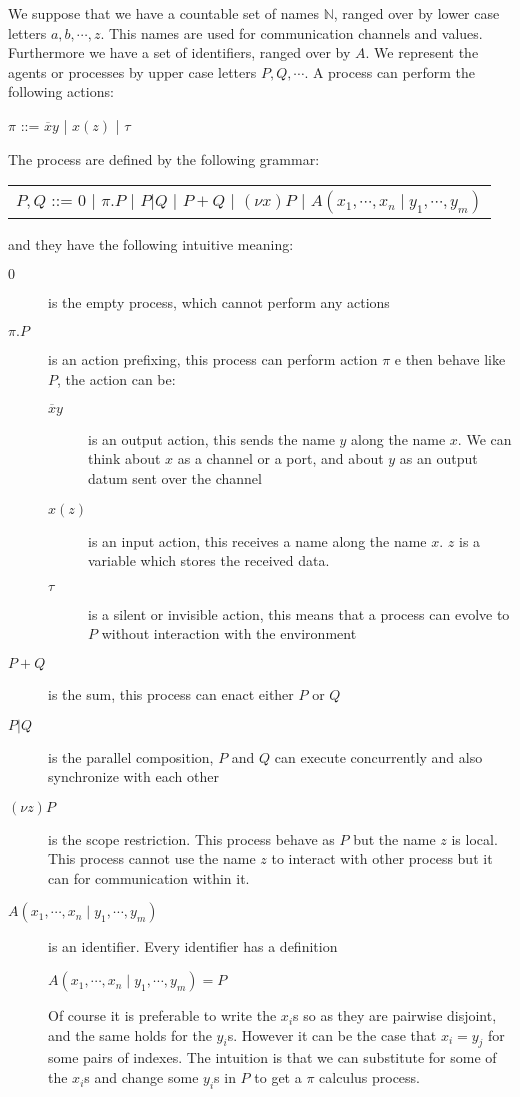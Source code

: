 We suppose that we have a countable set of names $\mathbb{N}$, ranged over by lower case letters $a,b, \cdots, z$. This names are used for communication channels and values. Furthermore we have a set of identifiers, ranged over by $A$. We represent the agents or processes by upper case letters $P,Q, \cdots $. A process can perform the following actions:
\begin{center}
  $\pi$ ::= $\overline{x}y$ | $x(z)$ | $\tau$ 
\end{center}
The process are defined by the following grammar:
\begin{center}
  \begin{tabular}{l}
    $P,Q$ ::= $0$ | $\pi.P$ | $P|Q$ | $P+Q$ | $(\nu x) P$ | $A(x_{1}, \cdots, x_{n}\; | \;y_{1}, \cdots, y_{m})$ 
  \end{tabular}
\end{center}
and they have the following intuitive meaning:
\begin{description}
  \item[$0$] 
    is the empty process, which cannot perform any actions
  \item[$\pi.P$] 
    is an action prefixing, this process can perform action $\pi$ e then behave like $P$, the action can be:
    \begin{description}
      \item[$\overline{x}y$] 
	is an output action, this sends the name $y$ along the name $x$. We can think about $x$ as a channel or a port, and about $y$ as an output datum sent over the channel
      \item[$x(z)$] 
	is an input action, this receives a name along the name $x$. $z$ is a variable which stores the received data.
      \item[$\tau$] 
	is a silent or invisible action, this means that a process can evolve to $P$ without interaction with the environment 
    \end{description}
  \item[$P+Q$] 
    is the sum, this process can enact either $P$ or $Q$
  \item[$P|Q$] 
    is the parallel composition, $P$ and $Q$ can execute concurrently and also synchronize with each other
  \item[$(\nu z) P$] 
    is the scope restriction. This process behave as $P$ but the name $z$ is local. This process cannot use the name $z$ to interact with other process but it can for communication within it.
  \item[$A(x_{1}, \cdots, x_{n}\; | \;y_{1}, \cdots, y_{m})$] 
    is an identifier. Every identifier has a definition
    \begin{center}
      $A(x_{1}, \cdots, x_{n}\; | \;y_{1}, \cdots, y_{m})=P$
    \end{center}
    Of course it is preferable to write the $x_{i}$s so as they are pairwise disjoint, and the same holds for the $y_{i}$s. However it can be the case that $x_{i}=y_{j}$ for some pairs of indexes. The intuition is that we can substitute for some of the $x_{i}$s and change some $y_{i}$s in $P$ to get a $\pi$ calculus process. 
\end{description}

